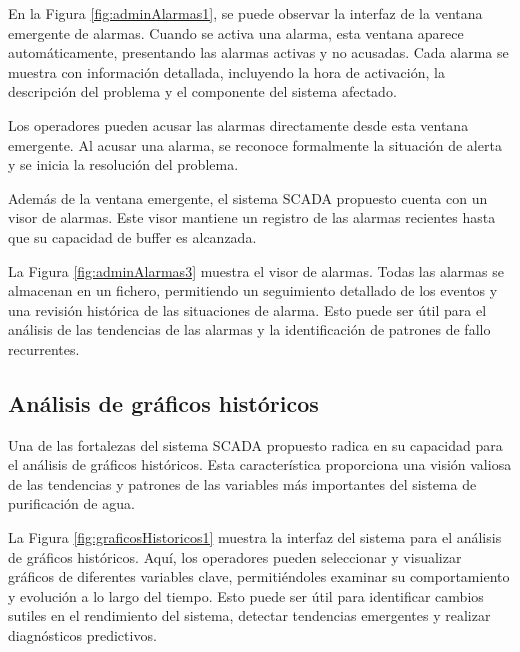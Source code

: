 
En la Figura \ref{fig:adminAlarmas1}, se puede observar la interfaz de la ventana emergente de alarmas. Cuando se activa una alarma, esta ventana aparece automáticamente, presentando las alarmas activas y no acusadas. Cada alarma se muestra con información detallada, incluyendo la hora de activación, la descripción del problema y el componente del sistema afectado.


Los operadores pueden acusar las alarmas directamente desde esta ventana emergente. Al acusar una alarma, se reconoce formalmente la situación de alerta y se inicia la resolución del problema.

Además de la ventana emergente, el sistema SCADA propuesto cuenta con un visor de alarmas. Este visor mantiene un registro de las alarmas recientes hasta que su capacidad de buffer es alcanzada.


La Figura \ref{fig:adminAlarmas3} muestra el visor de alarmas. Todas las alarmas se almacenan en un fichero, permitiendo un seguimiento detallado de los eventos y una revisión histórica de las situaciones de alarma. Esto puede ser útil para el análisis de las tendencias de las alarmas y la identificación de patrones de fallo recurrentes.

\subsection{Análisis de gráficos históricos}

Una de las fortalezas del sistema SCADA propuesto radica en su capacidad para el análisis de gráficos históricos. Esta característica proporciona una visión valiosa de las tendencias y patrones de las variables más importantes del sistema de purificación de agua.


La Figura \ref{fig:graficosHistoricos1} muestra la interfaz del sistema para el análisis de gráficos históricos. Aquí, los operadores pueden seleccionar y visualizar gráficos de diferentes variables clave, permitiéndoles examinar su comportamiento y evolución a lo largo del tiempo. Esto puede ser útil para identificar cambios sutiles en el rendimiento del sistema, detectar tendencias emergentes y realizar diagnósticos predictivos.


